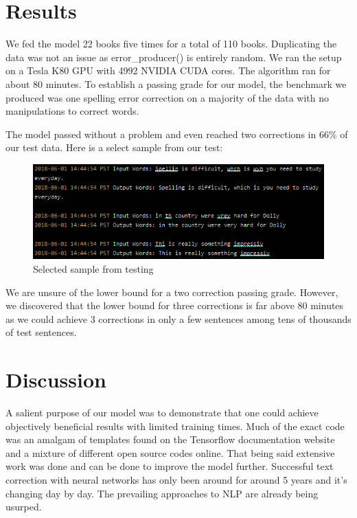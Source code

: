 \documentclass[11pt,a4paper]{scrartcl}
\theoremstyle{definition}
\begin{document}
\section{Results}
We fed the model 22 books five times for a total of 110 books. Duplicating the data was not an issue as error\_producer() is entirely random. We ran the setup on a Tesla K80 GPU with 4992 NVIDIA CUDA cores. The algorithm ran for about 80 minutes. To establish a passing grade for our model, the benchmark we produced was one spelling error correction on a majority of the data with no manipulations to correct words.\newline

The model passed without a problem and even reached two corrections in 66\% of our test data. Here is a select sample from our test:

\begin{figure}[!ht]
\centering
\includegraphics[scale=1]{results_1.png}
\caption{Selected sample from testing}
\label{figR1}
\end{figure}
\FloatBarrier

We are unsure of the lower bound for a two correction passing grade. However, we discovered that the lower bound for three corrections is far above 80 minutes as we could achieve 3 corrections in only a few sentences among tens of thousands of test sentences.

\section{Discussion}
A salient purpose of our model was to demonstrate that one could achieve objectively beneficial results with limited training times. Much of the exact code was an amalgam of templates found on the Tensorflow documentation website and a mixture of different open source codes online. That being said extensive work was done and can be done to improve the model further. Successful text correction with neural networks has only been around for around 5 years and it's changing day by day. The prevailing approaches to NLP are already being usurped.
\end{document}

